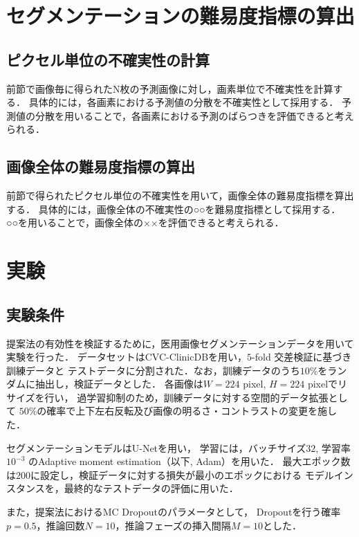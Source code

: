 \documentclass[10pt, a4paper, twocolumn]{jarticle}
\begin{document}
\section{セグメンテーションの難易度指標の算出}

\subsection{ピクセル単位の不確実性の計算}
前節で画像毎に得られたN枚の予測画像に対し，画素単位で不確実性を計算する．
具体的には，各画素における予測値の分散を不確実性として採用する．
予測値の分散を用いることで，各画素における予測のばらつきを評価できると考えられる．

\subsection{画像全体の難易度指標の算出}
前節で得られたピクセル単位の不確実性を用いて，画像全体の難易度指標を算出する．
具体的には，画像全体の不確実性の○○を難易度指標として採用する．
○○を用いることで，画像全体の××を評価できると考えられる．

\newpage

\section{実験}
\subsection{実験条件}
提案法の有効性を検証するために，医用画像セグメンテーションデータを用いて実験を行った．
データセットはCVC-ClinicDB\cite{BERNAL201599}を用い，$5$-fold 交差検証に基づき訓練データと
テストデータに分割された．なお，訓練データのうち$10 \%$をランダムに抽出し，検証データとした．
各画像は$W = 224$ pixel, $H = 224$ pixelでリサイズを行い，
過学習抑制のため，訓練データに対する空間的データ拡張として
$50\%$の確率で上下左右反転及び画像の明るさ・コントラストの変更を施した．

セグメンテーションモデルはU-Net\cite{ronneberger2015u}を用い，
学習には，バッチサイズ$32$, 学習率$10 ^ {−3}$ のAdaptive moment
estimation（以下, Adam）\cite{kingma2014adam}を用いた．
最大エポック数は$200$に設定し，検証データに対する損失が最小のエポックにおける
モデルインスタンスを，最終的なテストデータの評価に用いた．

また，提案法におけるMC Dropoutのパラメータとして，
Dropoutを行う確率$p = 0.5$，推論回数$N = 10$，推論フェーズの挿入間隔$M = 10$とした．
\end{document}
